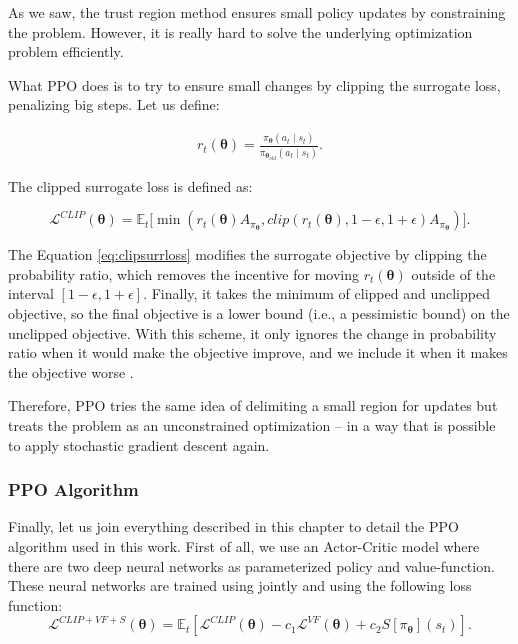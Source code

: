 As we saw, the trust region method ensures small policy updates by constraining the problem. However, it is really hard to solve the underlying optimization problem efficiently.

What PPO does is to try to ensure small changes by clipping the surrogate loss, penalizing big steps. Let us define:

\begin{eqnarray}
r_{t}(\boldsymbol{\theta}) = \frac{\pi_{\boldsymbol{\theta}}(a_{t} \mid s_{t})}{\pi_{\boldsymbol{\theta}_{old}}(a_{t} \mid s_{t})}.
\end{eqnarray}

The clipped surrogate loss is defined as:

\begin{equation}\label{eq:clipsurrloss}
\mathcal{L}^{CLIP}(\boldsymbol{\theta}) = \mathbb{E}_{t}\Big[ \min(r_{t}(\boldsymbol{\theta})A_{\pi_{\boldsymbol{\theta}}}, clip(r_{t}(\boldsymbol{\theta}), 1 - \epsilon, 1 + \epsilon)A_{\pi_{\boldsymbol{\theta}}})\Big].
\end{equation}

The Equation \eqref{eq:clipsurrloss} modifies the surrogate objective by clipping the probability ratio, which removes the incentive for moving $r_{t}(\boldsymbol{\theta})$ outside of the
interval $[1 - \epsilon, 1 + \epsilon]$. Finally, it takes the minimum of clipped and unclipped objective, so the
final objective is a lower bound (i.e., a pessimistic bound) on the unclipped objective. With this
scheme, it only ignores the change in probability ratio when it would make the objective improve, and we include it when it makes the objective worse \cite{ppoalgorithm}.

Therefore, PPO tries the same idea of delimiting a small region for updates but treats the problem as an unconstrained optimization -- in a way that is possible to apply stochastic gradient descent again. 

\subsubsection{PPO Algorithm}
Finally, let us join everything described in this chapter to detail the PPO algorithm used in this work. First of all, we use an Actor-Critic model where there are two deep neural networks as parameterized policy and value-function. These neural networks are trained using jointly and using the following loss function:
\begin{equation} \label{eq:finalppoloss}
\mathcal{L}^{CLIP + VF + S}(\boldsymbol{\theta}) = \mathbb{E}_{t}[\mathcal{L}^{CLIP}(\boldsymbol{\theta}) - c_{1} \mathcal{L}^{VF}(\boldsymbol{\theta}) + c_{2}S[\pi_{\boldsymbol{\theta}}](s_{t})].
\end{equation}

